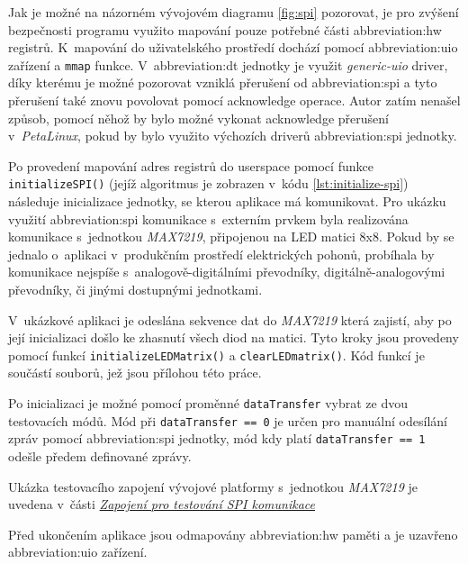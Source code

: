 \documentclass[a4paper, twoside, 11pt]{article}
\begin{document}
	Jak je možné na názorném vývojovém diagramu \ref{fig:spi} pozorovat, je pro zvýšení bezpečnosti programu využito mapování pouze potřebné části \gls{abbreviation:hw} registrů. K~mapování do uživatelského prostředí dochází pomocí \gls{abbreviation:uio} zařízení a \texttt{mmap} funkce. V~\gls{abbreviation:dt} jednotky je využit \textit{generic-uio} driver, díky kterému je možné pozorovat vzniklá přerušení od \gls{abbreviation:spi} a tyto přerušení také znovu povolovat pomocí acknowledge operace. Autor zatím nenašel způsob, pomocí něhož by bylo možné vykonat acknowledge přerušení v~\textit{PetaLinux}, pokud by bylo využito výchozích driverů \gls{abbreviation:spi} jednotky.\par
	Po provedení mapování adres registrů do userspace pomocí funkce \texttt{initializeSPI()} (jejíž algoritmus je zobrazen v~kódu \ref{lst:initialize-spi}) následuje inicializace jednotky, se kterou aplikace má komunikovat. Pro ukázku využití \gls{abbreviation:spi} komunikace s~externím prvkem byla realizována komunikace s~jednotkou \textit{MAX7219}, připojenou na LED matici 8x8. Pokud by se jednalo o~aplikaci v~produkčním prostředí elektrických pohonů, probíhala by komunikace nejspíše s~analogově-digitálními převodníky, digitálně-analogovými převodníky, či jinými dostupnými jednotkami.\par
	V~ukázkové aplikaci je odeslána sekvence dat do \textit{MAX7219} která zajistí, aby po její inicializaci došlo ke zhasnutí všech diod na matici. Tyto kroky jsou provedeny pomocí funkcí \texttt{initializeLEDMatrix()} a \texttt{clearLEDmatrix()}. Kód funkcí je součástí souborů, jež jsou přílohou této práce.\par
	Po inicializaci je možné pomocí proměnné \texttt{dataTransfer} vybrat ze dvou testovacích módů. Mód při \texttt{dataTransfer == 0} je určen pro manuální odesílání zpráv pomocí \gls{abbreviation:spi} jednotky, mód kdy platí \texttt{dataTransfer == 1} odešle předem definované zprávy.\par Ukázka testovacího zapojení vývojové platformy s~jednotkou \textit{MAX7219} je uvedena v~části \hyperref[subsubsec:zapojeni-pro-testovani-spi-komunikace]{\textit{Zapojení pro testování SPI komunikace}}\par
	Před ukončením aplikace jsou odmapovány \gls{abbreviation:hw} paměti a je uzavřeno \gls{abbreviation:uio} zařízení.
\end{document}
